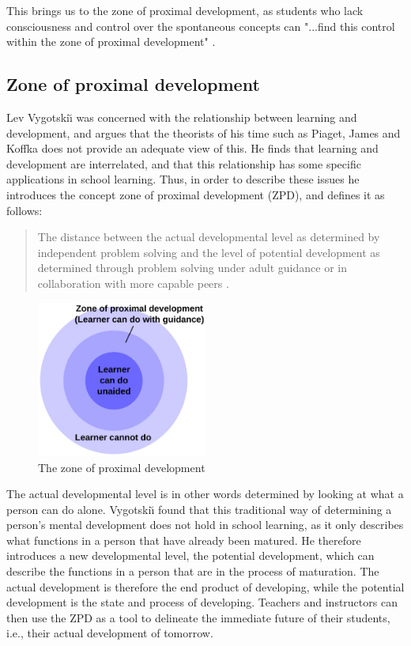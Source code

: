 This brings us to the zone of proximal development, as students who lack consciousness and control over the spontaneous concepts can "...find this control within the zone of proximal development" \citep[p. 194]{vygotsky2012thought}.

\subsection{Zone of proximal development}
Lev Vygotski{\u\i} was concerned with the relationship between learning and development, and argues that the theorists of his time such as Piaget, James and Koffka does not provide an adequate view of this. He finds that learning and development are interrelated, and that this relationship has some specific applications in school learning. \citep[p. 84]{vygotskiui1978mind} Thus, in order to describe these issues he introduces the concept zone of proximal development (ZPD), and defines it as follows:

\begin{quote}The distance between the actual developmental level as determined by independent problem solving and the level of potential development as determined through problem solving under adult guidance or in collaboration with more capable peers \citep[p. 86]{vygotskiui1978mind}.
\end{quote}

\begin{figure}
\centering
\includegraphics[width=0.5\textwidth]{img/theoretical/zpd.png}
\caption{The zone of proximal development \citep{wiki:zpd}}
\label{fig:zpd}
\end{figure}

The actual developmental level is in other words determined by looking at what a person can do alone. Vygotski{\u\i} found that this traditional way of determining a person's mental development does not hold in school learning, as it only describes what functions in a person that have already been matured. He therefore introduces a new developmental level, the potential development, which can describe the functions in a person that are in the process of maturation. The actual development is therefore the end product of developing, while the potential development is the state and process of developing. Teachers and instructors can then use the ZPD as a tool to delineate the immediate future of their students, i.e., their actual development of tomorrow.


